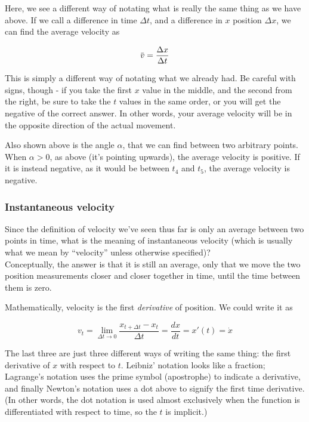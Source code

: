 \documentclass[12pt,a4paper]{report}
\newcommand{\overbar}[1]{\mkern 1.5mu\overline{\mkern-1.5mu#1\mkern-1.5mu}\mkern 1.5mu}
\begin{document}
Here, we see a different way of notating what is really the same thing as we have above. If we call a difference in time $\Delta t$, and a difference in $x$ position $\Delta x$, we can find the average velocity as

\begin{equation}
 \overbar{v} = \frac{\Delta x}{\Delta t}
\end{equation} 

This is simply a different way of notating what we already had. Be careful with signs, though - if you take the first $x$ value in the middle, and the second from the right, be sure to take the $t$ values in the same order, or you will get the negative of the correct answer. In other words, your average velocity will be in the opposite direction of the actual movement.

Also shown above is the angle $\alpha$, that we can find between two arbitrary points. When $\alpha > 0$, as above (it's pointing upwards), the average velocity is positive. If it is instead negative, as it would be between $t_4$ and $t_5$, the average velocity is negative.

\subsubsection{Instantaneous velocity}

Since the definition of velocity we've seen thus far is only an average between two points in time, what is the meaning of instantaneous velocity (which is usually what we mean by ``velocity'' unless otherwise specified)?\\
Conceptually, the answer is that it is still an average, only that we move the two position measurements closer and closer together in time, until the time between them is zero.

Mathematically, velocity is the first \emph{derivative} of position.
We could write it as

\begingroup
\large
\begin{equation}
 v_t = \lim_{\Delta t \to 0} \frac{x_{t + \Delta t} - x_t}{\Delta t} = \frac{dx}{dt} = x'(t) = \dot{x}
\end{equation}
\endgroup

The last three are just three different ways of writing the same thing: the first derivative of $x$ with respect to $t$. Leibniz' notation looks like a fraction; Lagrange's notation uses the prime symbol (apostrophe) to indicate a derivative, and finally Newton's notation uses a dot above to signify the first time derivative. (In other words, the dot notation is used almost exclusively when the function is differentiated with respect to time, so the $t$ is implicit.)
\end{document}
